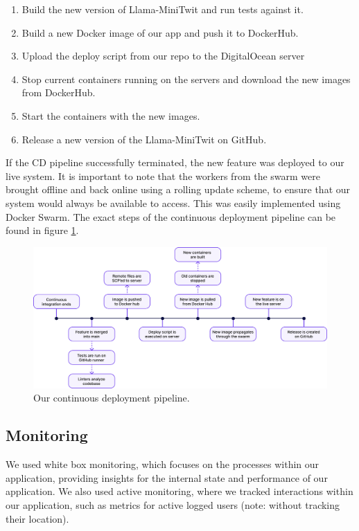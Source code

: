 \documentclass{article}
\begin{document}
\begin{enumerate}
    \item Build the new version of Llama-MiniTwit and run tests against it.
    \item Build a new Docker image of our app and push it to DockerHub.
    \item Upload the deploy script from our repo to the DigitalOcean server
    \item Stop current containers running on the servers and download the new images from DockerHub.
    \item Start the containers with the new images.
    \item Release a new version of the Llama-MiniTwit on GitHub.
\end{enumerate}

If the CD pipeline successfully terminated, the new feature was deployed to our live system. It is important to note that the workers from the swarm were brought offline and back online using a rolling update scheme, to ensure that our system would always be available to access. This was easily implemented using Docker Swarm. The exact steps of the continuous deployment pipeline can be found in figure \ref{fig: cd_pipeline}.

\begin{figure}[ht]
    \centering
    \includegraphics[width=1.0\textwidth]{./images/CD_pipeline_v2.png} 
    \caption{Our continuous deployment pipeline.}
    \label{fig: cd_pipeline}
\end{figure}

\subsection{Monitoring}

We used white box monitoring, which focuses on the processes within our application, providing insights for the internal state and performance of our application. We also used active monitoring, where we tracked interactions within our application, such as metrics for active logged users (note: without tracking their location).
\end{document}
